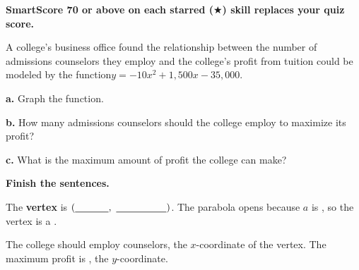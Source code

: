 \textbf{SmartScore 70 or above on each starred ($\bigstar$) skill replaces your quiz score.}

A college's business office found the relationship between the number of admissions counselors they employ and the college's profit from tuition could be modeled by the function\newline $y=-10x^2+1{,}500x-35{,}000$.\par

\begin{minipage}[t]{0.55\textwidth}
\vspace{0pt}
\textbf{a.} Graph the function.

\textbf{b.} How many admissions counselors should the college employ to maximize its profit?\lines[1]

\textbf{c.} What is the maximum amount of profit the college can make?\lines[1]

\vspace{4pt}
\textbf{Finish the sentences.}

The \textbf{vertex} is $(\blank[1.2cm],\ \blank[1.8cm])$. The parabola opens \blank[1.4cm] because $a$ is \blank[1.6cm], so the vertex is a \blank[1.8cm].

The college should employ \blank[1.2cm] counselors, the \mbox{$x$-coordinate} of the vertex. The maximum profit is \blank[2cm], the \mbox{$y$-coordinate}.
\end{minipage}\hfill
\begin{minipage}[t]{0.42\textwidth}
\vspace{0pt}
\end{minipage}


